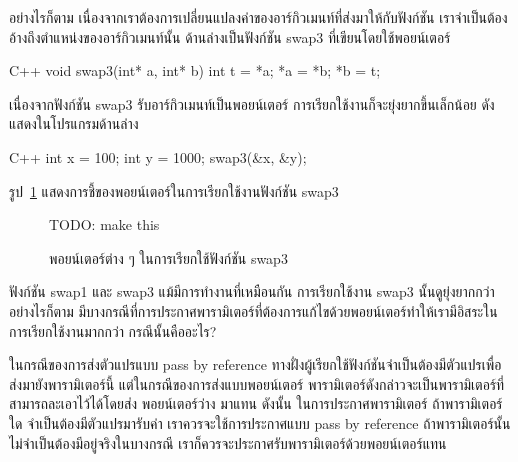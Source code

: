 อย่างไรก็ตาม เนื่องจาก{\wbr}เรา{\wbr}ต้องการ{\wbr}เปลี่ยนแปลง{\wbr}ค่า{\wbr}ของ{\wbr}อาร์กิวเมนท์{\wbr}ที่{\wbr}ส่ง{\wbr}มา{\wbr}ให้{\wbr}กับ{\wbr}ฟังก์ชัน{\wbr}
เรา{\wbr}จำเป็น{\wbr}ต้อง{\wbr}อ้าง{\wbr}ถึง{\wbr}ตำแหน่ง{\wbr}ของ{\wbr}อาร์กิวเมนท์{\wbr}นั้น ด้าน{\wbr}ล่าง{\wbr}เป็น{\wbr}ฟังก์ชัน {\ct swap3}
ที่{\wbr}เขียน{\wbr}โดย{\wbr}ใช้{\wbr}พอยน์เตอร์

\latintext
\begin{codelist}{C++}{}
void swap3(int* a, int* b)
{
  int t = *a;
  *a = *b;
  *b = t;
}
\end{codelist}
\thaitext

เนื่องจาก{\wbr}ฟังก์ชัน {\ct swap3} รับ{\wbr}อาร์กิวเมนท์{\wbr}เป็น{\wbr}พอยน์เตอร์
การ{\wbr}เรียก{\wbr}ใช้{\wbr}งาน{\wbr}ก็{\wbr}จะ{\wbr}ยุ่งยาก{\wbr}ขึ้น{\wbr}เล็กน้อย ดัง{\wbr}แสดง{\wbr}ใน{\wbr}โปรแกรม{\wbr}ด้าน{\wbr}ล่าง{\wbr}

\latintext
\begin{codelist}{C++}{}
int x = 100;
int y = 1000;
swap3(&x, &y);
\end{codelist}
\thaitext

รูป~\ref{fig:array-swap} แสดง{\wbr}การ{\wbr}ชี้{\wbr}ของ{\wbr}พอยน์เตอร์{\wbr}ใน{\wbr}การ{\wbr}เรียก{\wbr}ใช้{\wbr}งาน{\wbr}ฟังก์ชัน {\ct swap3}

\begin{figure}
TODO: make this
\caption{พอยน์เตอร์{\wbr}ต่าง ๆ ใน{\wbr}การ{\wbr}เรียก{\wbr}ใช้{\wbr}ฟังก์ชัน {\ct swap3}}
\label{fig:array-swap}
\end{figure}


\begin{quiz}{}
ฟังก์ชัน {\ct swap1} และ {\ct swap3} แม้{\wbr}มี{\wbr}การ{\wbr}ทำงาน{\wbr}ที่{\wbr}เหมือน{\wbr}กัน การ{\wbr}เรียก{\wbr}ใช้{\wbr}งาน{\wbr}
{\ct swap3} นั้น{\wbr}ดู{\wbr}ยุ่งยาก{\wbr}กว่า อย่างไรก็ตาม{\wbr}
มี{\wbr}บาง{\wbr}กรณี{\wbr}ที่{\wbr}การ{\wbr}ประกาศ{\wbr}พารามิเตอร์{\wbr}ที่{\wbr}ต้องการ{\wbr}แก้ไข{\wbr}ด้วย{\wbr}พอยน์เตอร์{\wbr}ทำ{\wbr}ให้{\wbr}เรา{\wbr}มี{\wbr}อิสระ{\wbr}ใน{\wbr}การ{\wbr}เรียก{\wbr}ใช้{\wbr}งาน{\wbr}มาก{\wbr}กว่า กรณี{\wbr}นั้น{\wbr}คือ{\wbr}อะไร?
\end{quiz}
\begin{quizans}
ใน{\wbr}กรณี{\wbr}ของ{\wbr}การ{\wbr}ส่ง{\wbr}ตัวแปร{\wbr}แบบ pass by reference
ทาง{\wbr}ฝั่ง{\wbr}ผู้{\wbr}เรียก{\wbr}ใช้{\wbr}ฟังก์ชัน{\wbr}จำเป็น{\wbr}ต้อง{\wbr}มี{\wbr}ตัวแปร{\wbr}เพื่อ{\wbr}ส่ง{\wbr}มา{\wbr}ยัง{\wbr}พารามิเตอร์{\wbr}นี้{\wbr}
แต่{\wbr}ใน{\wbr}กรณี{\wbr}ของ{\wbr}การ{\wbr}ส่ง{\wbr}แบบ{\wbr}พอยน์เตอร์
พารามิเตอร์{\wbr}ดังกล่าว{\wbr}จะ{\wbr}เป็น{\wbr}พารามิเตอร์{\wbr}ที่{\wbr}สามารถ{\wbr}ละ{\wbr}เอา{\wbr}ไว้{\wbr}ได้{\wbr}โดย{\wbr}ส่ง พอยน์เตอร์ว่าง {}
มา{\wbr}แทน ดังนั้น ใน{\wbr}การ{\wbr}ประกาศ{\wbr}พารามิเตอร์ ถ้า{\wbr}พารามิเตอร์{\wbr}ใด จำเป็น{\wbr}ต้อง{\wbr}มี{\wbr}ตัวแปร{\wbr}มา{\wbr}รับ{\wbr}ค่า{\wbr}
เรา{\wbr}ควร{\wbr}จะ{\wbr}ใช้{\wbr}การ{\wbr}ประกาศ{\wbr}แบบ pass by reference
ถ้า{\wbr}พารามิเตอร์{\wbr}นั้น{\wbr}ไม่{\wbr}จำเป็น{\wbr}ต้อง{\wbr}มี{\wbr}อยู่จริง{\wbr}ใน{\wbr}บาง{\wbr}กรณี{\wbr}
เรา{\wbr}ก็{\wbr}ควร{\wbr}จะ{\wbr}ประกาศ{\wbr}รับ{\wbr}พารามิเตอร์{\wbr}ด้วย{\wbr}พอยน์เตอร์{\wbr}แทน{\wbr}
\end{quizans}

